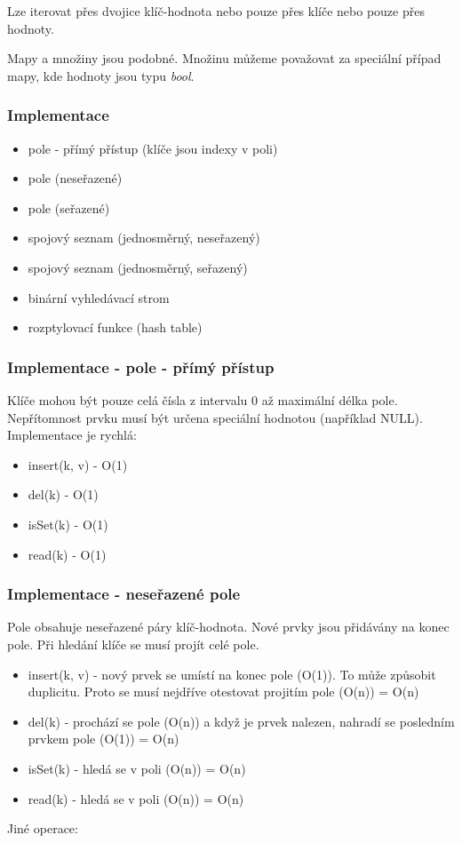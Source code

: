 \documentclass{szzclass}
\begin{document}
Lze iterovat přes dvojice klíč-hodnota nebo pouze přes klíče nebo pouze přes hodnoty.

Mapy a množiny jsou podobné. Množinu můžeme považovat
za speciální případ mapy, kde hodnoty jsou typu \textit{bool}.

\subsubsection{Implementace}
\begin{itemize}
    \item pole - přímý přístup (klíče jsou indexy v poli)
    \item pole (neseřazené)
    \item pole (seřazené)
    \item spojový seznam (jednosměrný, neseřazený)
    \item spojový seznam (jednosměrný, seřazený)
    \item binární vyhledávací strom
    \item rozptylovací funkce (hash table)
\end{itemize}
\subsubsection{Implementace - pole - přímý přístup}
Klíče mohou být pouze celá čísla z intervalu 0 až maximální délka pole.
Nepřítomnost prvku musí být určena speciální hodnotou (například NULL).
Implementace je rychlá:
\begin{itemize}
    \item insert(k, v) - O(1)
    \item del(k) - O(1)
    \item isSet(k) - O(1)
    \item read(k) - O(1)
\end{itemize}

\subsubsection{Implementace - neseřazené pole}
Pole obsahuje neseřazené páry klíč-hodnota. Nové prvky jsou přidávány na konec pole.
Při hledání klíče se musí projít celé pole.
\begin{itemize}
    \item insert(k, v) - nový prvek se umístí na konec pole (O(1)). To může způsobit duplicitu. Proto se musí nejdříve otestovat projitím pole (O(n)) = O(n)
    \item del(k) - prochází se pole (O(n)) a když je prvek nalezen, nahradí se posledním prvkem pole (O(1)) = O(n)
    \item isSet(k) - hledá se v poli (O(n)) = O(n)
    \item read(k) - hledá se v poli (O(n)) = O(n)
\end{itemize}
Jiné operace:
\end{document}
